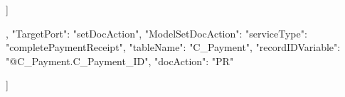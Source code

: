 {{{{{{                     ]
                      }

                    }

                    },
                    {
                    "TargetPort": "setDocAction",                      
                    "ModelSetDocAction": {
                        "serviceType": "completePaymentReceipt",
                        "tableName": "C_Payment",
                        "recordIDVariable": "@C_Payment.C_Payment_ID",
                        "docAction": "PR"
                    }
                    }


                  ]
              }

          
    }
}




